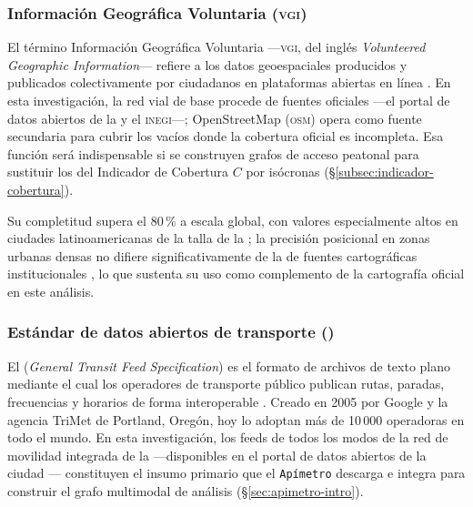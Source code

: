 \subsubsection*{Información Geográfica Voluntaria (\textsc{vgi})}
\label{subsubsec:glosario-vgi}
El término Información Geográfica Voluntaria ---\textsc{vgi}, del inglés
\textit{Volunteered Geographic Information}--- refiere a los datos geoespaciales
producidos y publicados colectivamente por ciudadanos en plataformas abiertas en
línea \citep{haklay2010good}. En esta investigación, la red vial de base procede
de fuentes oficiales ---el portal de datos abiertos de la \cdmx{} y el
\textsc{inegi}---; OpenStreetMap (\textsc{osm}) opera como fuente secundaria
para cubrir los vacíos donde la cobertura oficial es incompleta. Esa función
será indispensable si se construyen grafos de acceso peatonal para sustituir los
 del Indicador de Cobertura $C$ por isócronas
(§\ref{subsec:indicador-cobertura}).

Su completitud supera el 80\,\% a escala global, con valores especialmente altos
en ciudades latinoamericanas de la talla de la \zmvm{}; la precisión posicional
en zonas urbanas densas no difiere significativamente de la de fuentes
cartográficas institucionales \citep{barrington2017world, haklay2010good}, lo
que sustenta su uso como complemento de la cartografía oficial en este análisis.

\subsubsection*{Estándar de datos abiertos de transporte (\gtfs{})}
\label{subsubsec:glosario-gtfs}
El \gtfs{} (\textit{General Transit Feed Specification}) es el formato de
archivos de texto plano mediante el cual los operadores de transporte público
publican rutas, paradas, frecuencias y horarios de forma interoperable
\citep{fortin2016innovative}. Creado en 2005 por Google y la agencia TriMet de
Portland, Oregón, hoy lo adoptan más de 10\,000 operadoras en todo el mundo. En
esta investigación, los feeds \gtfs{} de todos los modos de la red de movilidad
integrada de la \cdmx{} ---disponibles en el portal de datos abiertos de la
ciudad \citep{adip_gtfs_2024}--- constituyen el insumo primario que el \texttt{Apímetro}
descarga e integra para construir el grafo multimodal de análisis
(§\ref{sec:apimetro-intro}).

